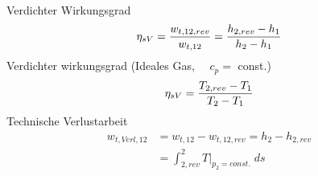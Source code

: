 \documentclass[twocolumn]{article}
\begin{document}
\begin{multicols}{2}
\begin{tikzpicture}
\end{tikzpicture}
\\

	
Verdichter Wirkungsgrad
\begin{equation*}
	\eta_{sV} = \frac{w_{t,12,rev}}{w_{t,12}} = \frac{h_{2,rev} - h_1}{h_2 - h_1} \\
\end{equation*}
Verdichter wirkungsgrad (Ideales Gas, $\quad c_p = $ const.)
\begin{equation*}
	\eta_{sV} = \frac{T_{2,rev} - T_1}{T_2 -T_1} \\
\end{equation*}
Technische Verlustarbeit
\begin{align*}
	w_{t,Verl,12} 	&= w_{t,12} - w_{t,12,rev} = h_2 - h_{2,rev} \\
			&= \int_{2,rev}^{2} T|_{p_2=const.}\; ds
\end{align*}


\end{multicols}
\end{document}
